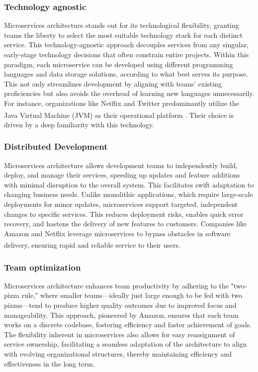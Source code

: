\subsubsection{Technology agnostic}
Microservices architecture stands out for its technological flexibility, granting teams the liberty
to select the most suitable technology stack for each distinct service. This technology-agnostic
approach decouples services from any singular, early-stage technology decisions that often constrain
entire projects. Within this paradigm, each microservice can be developed using different
programming languages and data storage solutions, according to what best serves its purpose. This
not only streamlines development by aligning with teams' existing proficiencies but also avoids the
overhead of learning new languages unnecessarily. For instance, organizations like Netflix and
Twitter predominantly utilize the Java Virtual Machine (JVM) as their operational platform
\textsuperscript{\cite{microservices_book}}. Their choice is driven by a deep familiarity with this
technology.

\subsubsection{Distributed Development}
Microservices architecture allows development teams to independently build, deploy, and manage their
services, speeding up updates and feature additions with minimal disruption to the overall system.
This facilitates swift adaptation to changing business needs. Unlike monolithic applications, which
require large-scale deployments for minor updates, microservices support targeted, independent
changes to specific services. This reduces deployment risks, enables quick error recovery, and
hastens the delivery of new features to customers. Companies like Amazon and Netflix leverage
microservices to bypass obstacles in software delivery, ensuring rapid and reliable service to their
users\textsuperscript{\cite{microservices_book}}.

\subsubsection{Team optimization}
Microservices architecture enhances team productivity by adhering to the "two-pizza rule," where
smaller teams—ideally just large enough to be fed with two pizzas—tend to produce higher quality
outcomes due to improved focus and manageability. This approach, pioneered by Amazon, ensures that
each team works on a discrete codebase, fostering efficiency and faster achievement of goals. The
flexibility inherent in microservices also allows for easy reassignment of service ownership,
facilitating a seamless adaptation of the architecture to align with evolving organizational
structures, thereby maintaining efficiency and effectiveness in the long term.



